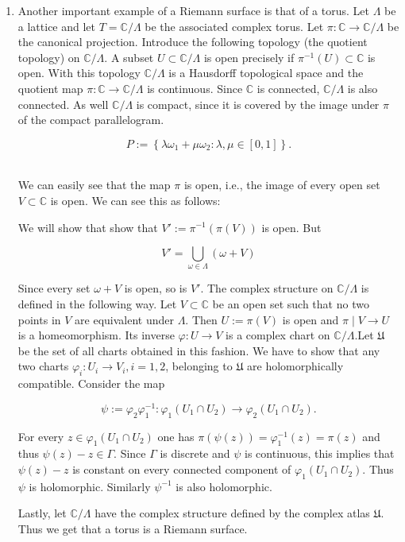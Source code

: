 \begin{example}
\begin{enumerate}
\item Another important example of a Riemann surface is that of a torus. 
Let $\Lambda$ be a lattice and let $T=\mathbb{C}/\Lambda$ be the associated complex torus. Let $\pi: \mathbb{C} \rightarrow \mathbb{C}/\Lambda $ be the canonical projection. 
Introduce the following topology (the quotient topology) on $\mathbb{C} / \Lambda$. A subset $U \subset \mathbb{C} / \Lambda$ is open precisely if $\pi^{-1}(U) \subset \mathbb{C}$ is open. With this topology $\mathbb{C} / \Lambda$ is a Hausdorff topological space and the quotient map $\pi: \mathbb{C} \rightarrow \mathbb{C} / \Lambda$ is continuous. Since $\mathbb{C}$ is connected, $\mathbb{C} / \Lambda$ is also connected. As well $\mathbb{C} / \Lambda$ is compact, since it is covered by the image under $\pi$ of the compact parallelogram.

$$
P:=\left\{\lambda \omega_{1}+\mu \omega_{2}: \lambda, \mu \in[0,1]\right\} .
$$

\\
We can easily see that the map $\pi$ is open, i.e., the image of every open set $V \subset \mathbb{C}$ is open. We can see this as follows: 

We will show that  show that $V':=\pi^{-1}(\pi(V))$ is open. But

$$
V'=\bigcup_{\omega \in \Lambda}(\omega+V)
$$

Since every set $\omega+V$ is open, so is $V'$. The complex structure on $\mathbb{C} / \Lambda$ is defined in the following way. Let $V \subset \mathbb{C}$ be an open set such that no two points in $V$ are equivalent under $\Lambda$. Then $U:=\pi(V)$ is open and $\pi \mid V \rightarrow U$ is a homeomorphism. Its inverse $\varphi: U \rightarrow V$ is a complex chart on $\mathbb{C} / \Lambda$.Let $\mathfrak{U}$ be the set of all charts obtained in this fashion. We have to show that any two charts $\varphi_{i}: U_{i} \rightarrow V_{i}, i=1,2$, belonging to $\mathfrak{U}$ are holomorphically compatible. Consider the map

$$
\psi:=\varphi_{2} \varphi_{1}^{-1}: \varphi_{1}\left(U_{1} \cap U_{2}\right) \rightarrow \varphi_{2}\left(U_{1} \cap U_{2}\right) .
$$

For every $z \in \varphi_{1}\left(U_{1} \cap U_{2}\right)$ one has $\pi(\psi(z))=\varphi_{1}^{-1}(z)=\pi(z)$ and thus $\psi(z)-z \in \Gamma$. Since $\Gamma$ is discrete and $\psi$ is continuous, this implies that $\psi(z)-z$ is constant on every connected component of $\varphi_{1}\left(U_{1} \cap U_{2}\right)$. Thus $\psi$ is holomorphic. Similarly $\psi^{-1}$ is also holomorphic.

Lastly, let $\mathbb{C} / \Lambda$ have the complex structure defined by the complex atlas $\mathfrak{U}$. Thus we get that a torus is a Riemann surface. 
\end{enumerate}
    
\end{example}
